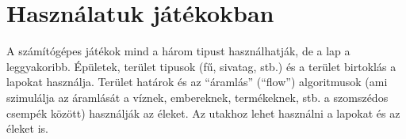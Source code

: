 \section*{Használatuk játékokban}

A számítógépes játékok mind a három tipust használhatják, de a lap a leggyakoribb. Épületek, terület tipusok (fű, sivatag, stb.) és a terület birtoklás a lapokat használja. Terület határok és az “áramlás” (“flow”) algoritmusok (ami szimulálja az áramlását a víznek, embereknek, termékeknek, stb. a szomszédos csempék között) használják az éleket. Az utakhoz lehet használni a lapokat és az éleket is.